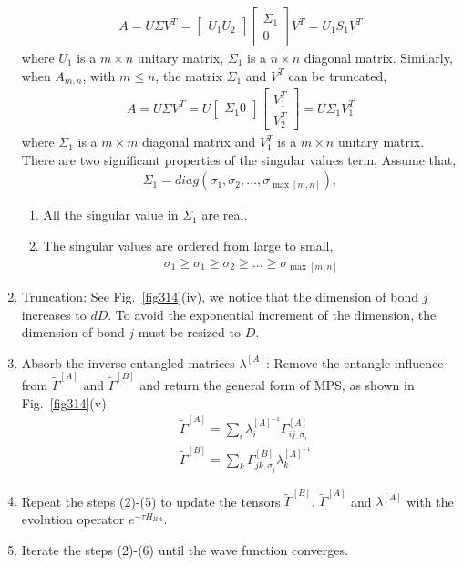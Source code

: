 \begin{enumerate}
		\begin{align}
			A = U \Sigma V^T = \begin{bmatrix} U_1 U_2 \end{bmatrix} \begin{bmatrix} \Sigma_1 \\ 0 \end{bmatrix} V^T = U_1 S_1 V^T
		\end{align}
		where $U_1$ is a $m \times n$ unitary matrix, $\Sigma_1$ is a $n \times n$ diagonal matrix. Similarly, when $A_{m,n}$, with $m \leq n$, the matrix $\Sigma_1$ and $V^T$ can be truncated,
\begin{align}
	A = U \Sigma V^T = U \begin{bmatrix} \Sigma_1 0 \end{bmatrix} \begin{bmatrix} V_1^T \\ V_2^T \end{bmatrix} = U \Sigma_1 V_1^T
\end{align}
where $\Sigma_1$ is a $m \times m$ diagonal matrix and $V_1^T$ is a $m \times n$ unitary matrix. There are two significant properties of the singular values term, Assume that,
\begin{align}
\Sigma_1 = diag \left(\sigma_1, \sigma_2, \dots, \sigma_{\max{[m,n]}} \right), 
\end{align}
\begin{enumerate}
	\item All the singular value in $\Sigma_1$ are real.
	\item The singular values are ordered from large to small,
		\begin{align}
			\sigma_1 \geq \sigma_1 \geq \sigma_2 \geq \dots \geq \sigma_{\max{[m,n]}}
		\end{align}
\end{enumerate}
		\item Truncation: See Fig.~\ref{fig314}(iv), we notice that the dimension of bond $j$ increases to $dD$. To avoid the exponential increment of the dimension, the dimension of bond $j$ must be resized to $D$.
		\item Absorb the inverse entangled matrices $\lambda^{[A]}$: Remove the entangle influence from $\widetilde{\Gamma}^{[A]}$ and $\widetilde{\Gamma}^{[B]}$ and return the general form of MPS, as shown in Fig.~\ref{fig314}(v).
			\begin{align}
				&\widetilde{\Gamma}^{[A]} = \sum_{i}{ \lambda_{i}^{[A]^{-1}} \Gamma^{[A]}_{ij,\sigma_i}} \\
				&\widetilde{\Gamma}^{[B]} = \sum_{k}{\Gamma^{[B]}_{jk,\sigma_j} \lambda_{k}^{[A]^{-1}}}
			\end{align}
		\item Repeat the steps (2)-(5) to update the tensors $\widetilde{\Gamma}^{[B]}$, $\widetilde{\Gamma}^{[A]}$ and $\lambda^{[A]}$ with the evolution operator $e^{-\tau H_{BA}}$.
		\item Iterate the steps (2)-(6) until the wave function converges.
\end{enumerate}

